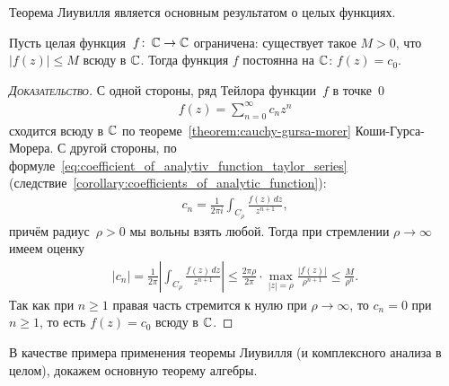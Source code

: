 \documentclass[../complex-analysis.tex]{subfiles}
\begin{document}
Теорема Лиувилля является основным результатом о целых функциях.

\begin{thm}[Лиувилля]
 \label{theorem:liuvill}
 Пусть целая функция~$ f\colon\,\mathbb{C}\to\mathbb{C} $ ограничена: существует такое $ M > 0 $, что $ \left| f(z) \right| \leqslant M $ всюду в $ \mathbb{C} $. Тогда функция $ f $ постоянна на $ \mathbb{C} $: $ f(z) = c_0 $.
\end{thm}
\begin{proof}[\normalfont\textsc{Доказательство}]
 С одной стороны, ряд Тейлора функции~$ f $ в точке~$ 0 $
 \begin{align*}
  f(z) = \sum_{n=0}^{\infty} c_n z^{n}
 \end{align*} сходится всюду в $ \mathbb{C} $ по теореме~\ref{theorem:cauchy-gursa-morer} Коши-Гурса-Морера. С другой стороны, по формуле~\eqref{eq:coefficient_of_analytiv_function_taylor_series} (следствие~\ref{corollary:coefficients_of_analytic_function}):
 \begin{align*}
  c_n = \frac{1}{2\pi i} \int_{C_\rho} \frac{f(z)\,dz}{z^{n+1}},
 \end{align*} причём радиус~$ \rho > 0 $ мы вольны взять любой. Тогда при стремлении $ \rho \to \infty $ имеем оценку
 \begin{align*}
  \left| c_n \right| = \frac{1}{2\pi} \left| \int_{C_\rho} \frac{f(z)\,dz}{z^{n+1}}  \right|\leqslant \frac{2\pi\rho}{2\pi} \cdot \max_{\left| z \right|=\rho} \frac{\left| f(z) \right|}{\rho^{n+1}} \leqslant \frac{M}{\rho^{n}}.
 \end{align*} Так как при $ n \geqslant 1 $ правая часть стремится к нулю при $ \rho \to \infty $, то $ c_n = 0 $ при $ n \geqslant 1 $, то есть $ f(z) = c_0 $ всюду в $ \mathbb{C} $.
\end{proof}

В качестве примера применения теоремы Лиувилля (и комплексного анализа в целом), докажем основную теорему алгебры.
\end{document}
